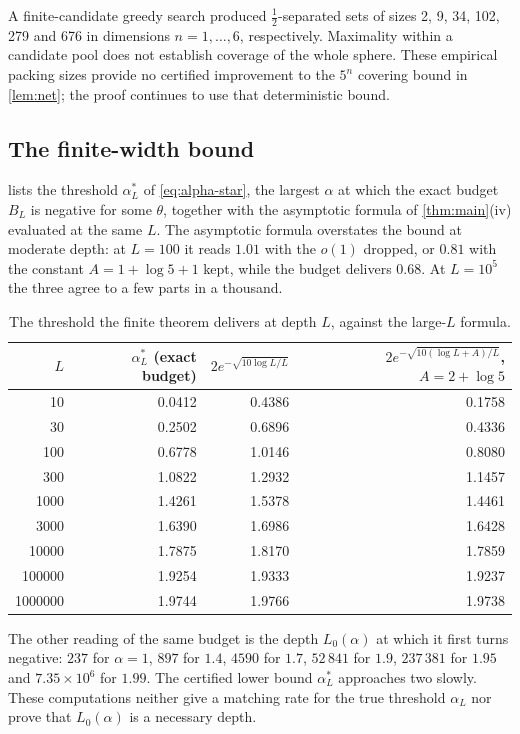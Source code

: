 A finite-candidate greedy search produced $\tfrac12$-separated sets of sizes 2, 9, 34, 102, 279 and 676 in dimensions $n=1,\dots,6$, respectively. Maximality within a candidate pool does not establish coverage of the whole sphere. These empirical packing sizes provide no certified improvement to the $5^n$ covering bound in \cref{lem:net}; the proof continues to use that deterministic bound.

\subsection{The finite-width bound}

 lists the threshold $\alpha^*_L$ of \cref{eq:alpha-star}, the largest $\alpha$ at which the exact budget $B_L$ is negative for some $\theta$, together with the asymptotic formula of \cref{thm:main}(iv) evaluated at the same $L$. The asymptotic formula overstates the bound at moderate depth: at $L=100$ it reads $1.01$ with the $o(1)$ dropped, or $0.81$ with the constant $A=1+\log5+1$ kept, while the budget delivers $0.68$. At $L=10^5$ the three agree to a few parts in a thousand.

\begin{table}[h]\centering
\begin{tabular}{rrrr}
\toprule
$L$ & $\alpha^*_L$ (exact budget) & $2e^{-\sqrt{10\log L/L}}$ & $2e^{-\sqrt{10(\log L+A)/L}}$, $A=2+\log5$\\
\midrule
10 & 0.0412 & 0.4386 & 0.1758\\
30 & 0.2502 & 0.6896 & 0.4336\\
100 & 0.6778 & 1.0146 & 0.8080\\
300 & 1.0822 & 1.2932 & 1.1457\\
1000 & 1.4261 & 1.5378 & 1.4461\\
3000 & 1.6390 & 1.6986 & 1.6428\\
10000 & 1.7875 & 1.8170 & 1.7859\\
100000 & 1.9254 & 1.9333 & 1.9237\\
1000000 & 1.9744 & 1.9766 & 1.9738\\
\bottomrule
\end{tabular}
\caption{The threshold the finite theorem delivers at depth $L$, against the large-$L$ formula.}
\label{tab:threshold}
\end{table}

The other reading of the same budget is the depth $L_0(\alpha)$ at which it first turns negative: $237$ for $\alpha=1$, $897$ for $1.4$, $4590$ for $1.7$, $52\,841$ for $1.9$, $237\,381$ for $1.95$ and $7.35\times10^6$ for $1.99$. The certified lower bound $\alpha_L^*$ approaches two slowly. These computations neither give a matching rate for the true threshold $\alpha_L$ nor prove that $L_0(\alpha)$ is a necessary depth.

